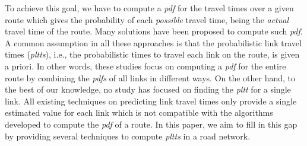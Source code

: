 To achieve this goal, we have to compute a \textit{pdf} for the travel times over a given route which gives the probability of each \textit{possible} travel time, being the \textit{actual} travel time of the route. Many solutions have been proposed to compute such \textit{pdf}. A common assumption in all these approaches is that the probabilistic link travel times (\textit{pltts}), i.e., the probabilistic times to travel each link on the route, is given a priori. In other words, these studies focus on computing a \textit{pdf} for the entire route by combining the \textit{pdfs} of all links in different ways. On the other hand, to the best of our knowledge, no study has focused on finding the \textit{pltt} for a single link. All existing techniques on predicting link travel times only provide a single estimated value for each link \cite{Pan13, Xu15} which is not compatible with the algorithms developed to compute the \textit{pdf} of a route. In this paper, we aim to fill in this gap by providing several techniques to compute \textit{pltts} in a road network.

